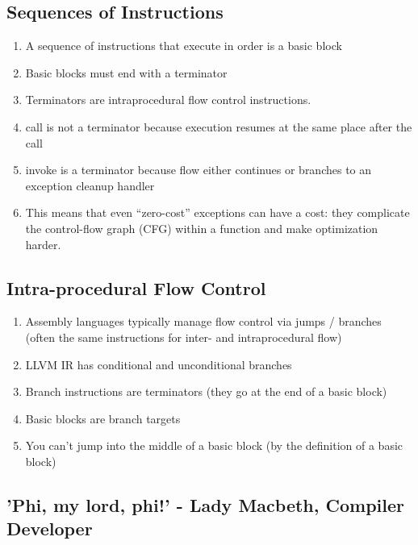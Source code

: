 \documentclass[a4paper]{exam}
\theoremstyle{definition}
\begin{document}
\subsection{Sequences of Instructions}
\begin{enumerate}

  \item A sequence of instructions that execute in order is a basic block
  \item Basic blocks must end with a terminator
  \item Terminators are intraprocedural flow control instructions.
  \item call is not a terminator because execution resumes at the same place after the call
  \item invoke is a terminator because flow either continues or branches to an exception cleanup handler
  \item This means that even “zero-cost” exceptions can have a cost: they complicate the control-flow graph (CFG) within a function and make optimization harder.
\end{enumerate}
\subsection{Intra-procedural Flow Control}
\begin{enumerate}
  \item Assembly languages typically manage flow control via jumps / branches (often the same instructions for inter- and intraprocedural flow)
  \item LLVM IR has conditional and unconditional branches
  \item Branch instructions are terminators (they go at the end of a
        basic block)
  \item Basic blocks are branch targets
  \item You can't jump into the middle of a basic block (by the definition of a basic block)
\end{enumerate}

\subsection{'Phi, my lord, phi!' - Lady Macbeth, Compiler Developer}
\end{document}
